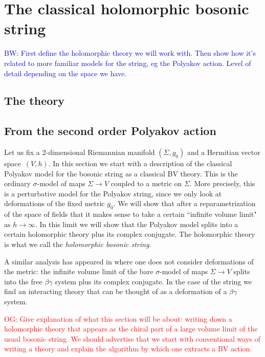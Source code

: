 \documentclass[10pt]{amsart}
\def\brian{\textcolor{blue}{BW: }\textcolor{blue}}
\def\owen{\textcolor{red}{OG: }\textcolor{red}}
\begin{document}
\section{The classical holomorphic bosonic string}

\brian{First define the holomorphic theory we will work with. Then show how it's related to more familiar models for the string, eg the Polyakov action. Level of detail depending on the space we have.
}

\subsection{The theory} 

\subsection{From the second order Polyakov action}

Let us fix a 2-dimensional Riemannian manifold $(\Sigma, g_0)$ and a Hermitian vector space~$(V,h)$. In this section we start with a description of the classical Polyakov model for the bosonic string as a classical BV theory. This is the ordinary $\sigma$-model of maps $\Sigma \to V$ coupled to a metric on $\Sigma$. More precisely, this is a perturbative model for the Polyakov string, since we only look at deformations of the fixed metric $g_0$. We will show that after a reparametrization of the space of fields that it makes sense to take a certain ``infinite volume limit" as $h \to \infty$. In this limit we will show that the Polyakov model splits into a certain holomorphic theory plus its complex conjugate. The holomorphic theory is what we call the {\em holomorphic bosonic string}.

\begin{rmk} A similar analysis has appeared in \cite{GGW} where one does not consider deformations of the metric: the infinite volume limit of the bare $\sigma$-model of maps $\Sigma \to V$ splits into the free $\beta\gamma$ system plus its complex conjugate. In the case of the string we find an interacting theory that can be thought of as a deformation of a $\beta\gamma$ system. 
\end{rmk}

\owen{Give explanation of what this section will be about: writing down a holomorphic theory that appears as the chiral part of a large volume limit of the usual bosonic string. We should advertise that we start with conventional ways of writing a theory and explain the algorithm by which one extracts a BV action.}
\end{document}
